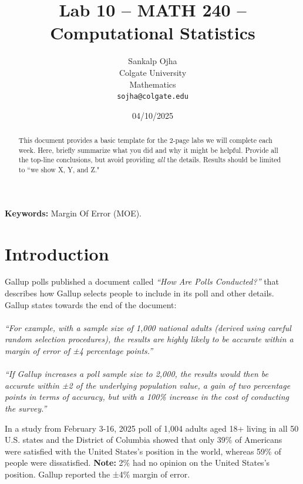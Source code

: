 \documentclass{article}\usepackage[]{graphicx}\usepackage[]{xcolor}
\begin{document}
\vspace{-1in}
\title{Lab 10 -- MATH 240 -- Computational Statistics}

\author{
  Sankalp Ojha \\
  Colgate University  \\
  Mathematics  \\
  {\tt sojha@colgate.edu}
}

\date{04/10/2025}

\maketitle

\begin{multicols}{2}
\begin{abstract}
This document provides a basic template for the 2-page labs we will complete each week. Here, briefly summarize what you did and why it might be helpful. Provide all the top-line conclusions, but avoid providing \emph{all} the details. Results should be limited to ``we show X, Y, and Z."
\end{abstract}

\noindent \textbf{Keywords:} Margin Of Error (MOE).

\section{Introduction}
Gallup polls published a document called \textit{“How Are Polls Conducted?”} that describes how Gallup selects people to include in its poll and other details. Gallup states towards the end of the document:
\\
\\
\textit{“For example, with a sample size of 1,000 national adults (derived using careful random selection procedures), the results are highly likely to be accurate within a margin of error of ±4 percentage points.”
\\
\\
“If Gallup increases a poll sample size to 2,000, the results would then be accurate within ±2%
of the underlying population value, a gain of two percentage points in terms of accuracy, but with a 100\% increase in the cost of conducting the survey.”}

In a study from February 3-16, 2025 poll of 1,004 adults aged 18+ living in all 50 U.S. states and the District of Columbia showed that only 39\% of Americans were satisfied with the United States's position in the world, whereas 59\% of people were dissatisfied. \textbf{Note:} 2\% had no opinion on the United States's position. Gallup reported the ±4\% margin of error.


\end{multicols}
\end{document}
